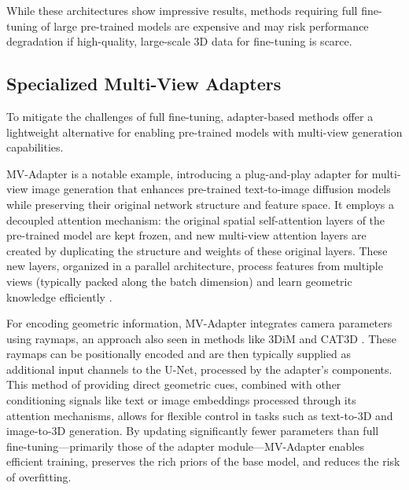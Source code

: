 While these architectures show impressive results, methods requiring full fine-tuning of large pre-trained models are expensive and may risk performance degradation if high-quality, large-scale 3D data for fine-tuning is scarce.

\subsection{Specialized Multi-View Adapters}
To mitigate the challenges of full fine-tuning, adapter-based methods offer a lightweight alternative for enabling pre-trained models with multi-view generation capabilities.

MV-Adapter \cite{mvadapter} is a notable example, introducing a plug-and-play adapter for multi-view image generation that enhances pre-trained text-to-image diffusion models while preserving their original network structure and feature space. It employs a decoupled attention mechanism: the original spatial self-attention layers of the pre-trained model are kept frozen, and new multi-view attention layers are created by duplicating the structure and weights of these original layers. These new layers, organized in a parallel architecture, process features from multiple views (typically packed along the batch dimension) and learn geometric knowledge efficiently \cite{mvadapter}. 

For encoding geometric information, MV-Adapter \cite{mvadapter} integrates camera parameters using raymaps, an approach also seen in methods like 3DiM \cite{novelviewsynthesisdiffusion} and CAT3D \cite{cat3d}. These raymaps can be positionally encoded and are then typically supplied as additional input channels to the U-Net, processed by the adapter's components. This method of providing direct geometric cues, combined with other conditioning signals like text or image embeddings processed through its attention mechanisms, allows for flexible control in tasks such as text-to-3D and image-to-3D generation. By updating significantly fewer parameters than full fine-tuning—primarily those of the adapter module—MV-Adapter enables efficient training, preserves the rich priors of the base model, and reduces the risk of overfitting.